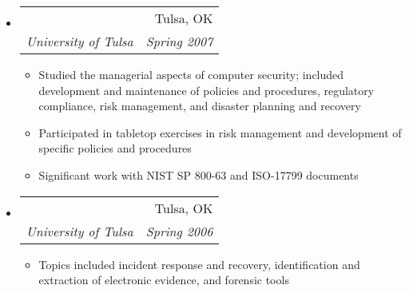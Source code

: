 \documentclass[letterpaper,11pt]{article}
\makeatletter
\newcommand{\resitem}[1]{\item #1 \vspace{-2pt}}
\newcommand{\ressubheading}[4]{
\begin{tabular*}{6.5in}{l@{\extracolsep{\fill}}r}
		\textbf{\parbox{5in}{\raggedright #1 }} & #2 \\
		\textit{#3} & \textit{#4} \\
\end{tabular*}\vspace{-6pt}}
\makeatother
\begin{document}
\begin{itemize}
\item
	\ressubheading{Enterprise Security Management}{Tulsa, OK}{University of Tulsa}{Spring 2007}
	\begin{itemize}
		\resitem{Studied the managerial aspects of computer security; included development and maintenance of policies and procedures, regulatory compliance, risk management, and disaster planning and recovery}
		\resitem{Participated in tabletop exercises in risk management and development of specific policies and procedures}
		\resitem{Significant work with NIST SP 800-63 and ISO-17799 documents}
	\end{itemize}
\item
	\ressubheading{Computer Forensics}{Tulsa, OK}{University of Tulsa}{Spring 2006}
	\begin{itemize}
		\resitem{Topics included incident response and recovery, identification and extraction of electronic evidence, and forensic tools}
	\end{itemize}
\end{itemize}
\end{document}

